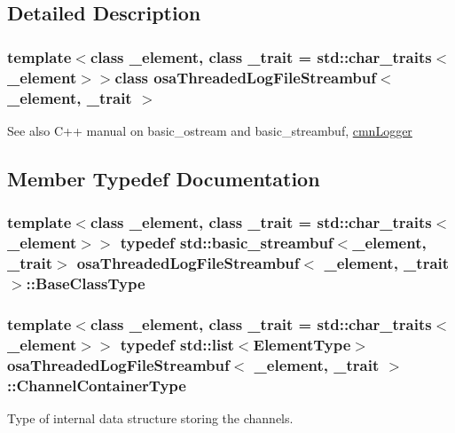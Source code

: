 \subsection{Detailed Description}
\subsubsection*{template$<$class \+\_\+element, class \+\_\+trait = std\+::char\+\_\+traits$<$\+\_\+element$>$$>$class osa\+Threaded\+Log\+File\+Streambuf$<$ \+\_\+element, \+\_\+trait $>$}

\begin{DoxySeeAlso}{See also}
C++ manual on basic\+\_\+ostream and basic\+\_\+streambuf, \hyperlink{classcmn_logger}{cmn\+Logger} 
\end{DoxySeeAlso}


\subsection{Member Typedef Documentation}
\hypertarget{classosa_threaded_log_file_streambuf_a918db063483813434ed1d8f81c3fb205}{}
\subsubsection[{Base\+Class\+Type}]{\setlength{\rightskip}{0pt plus 5cm}template$<$class \+\_\+element, class \+\_\+trait = std\+::char\+\_\+traits$<$\+\_\+element$>$$>$ typedef std\+::basic\+\_\+streambuf$<$\+\_\+element, \+\_\+trait$>$ {\bf osa\+Threaded\+Log\+File\+Streambuf}$<$ \+\_\+element, \+\_\+trait $>$\+::{\bf Base\+Class\+Type}}\label{classosa_threaded_log_file_streambuf_a918db063483813434ed1d8f81c3fb205}
\hypertarget{classosa_threaded_log_file_streambuf_aa02aa00f9d3dbd620e15914d5ee83fb5}{}
\subsubsection[{Channel\+Container\+Type}]{\setlength{\rightskip}{0pt plus 5cm}template$<$class \+\_\+element, class \+\_\+trait = std\+::char\+\_\+traits$<$\+\_\+element$>$$>$ typedef std\+::list$<${\bf Element\+Type}$>$ {\bf osa\+Threaded\+Log\+File\+Streambuf}$<$ \+\_\+element, \+\_\+trait $>$\+::{\bf Channel\+Container\+Type}}\label{classosa_threaded_log_file_streambuf_aa02aa00f9d3dbd620e15914d5ee83fb5}
Type of internal data structure storing the channels. \hypertarget{classosa_threaded_log_file_streambuf_a216ca33908152519430e5456e828805f}{}
